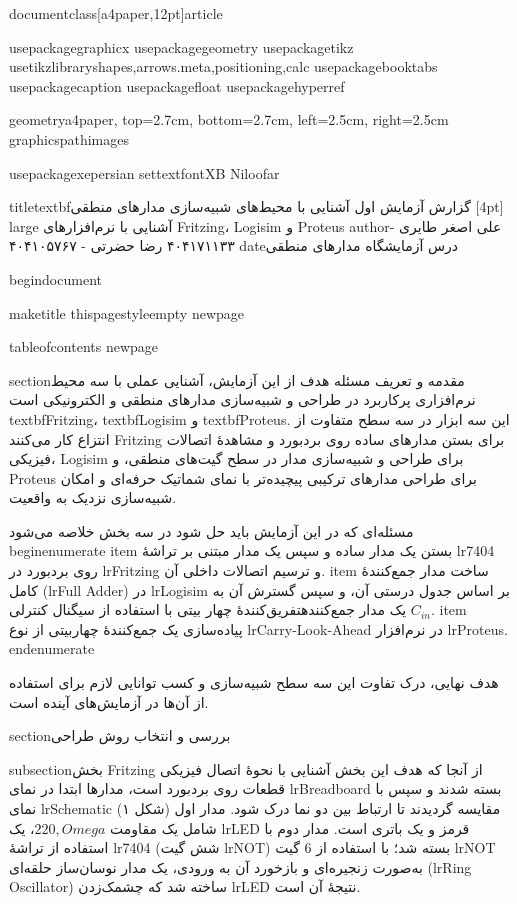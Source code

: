 documentclass[a4paper,12pt]{article}

usepackage{graphicx}
usepackage{geometry}
usepackage{tikz}
usetikzlibrary{shapes,arrows.meta,positioning,calc}
usepackage{booktabs}
usepackage{caption}
usepackage{float}
usepackage{hyperref}

geometry{a4paper, top=2.7cm, bottom=2.7cm, left=2.5cm, right=2.5cm}
graphicspath{{images}}

usepackage{xepersian}
settextfont{XB Niloofar}

title{textbf{گزارش آزمایش اول آشنایی با محیط‌های شبیه‌سازی مدارهای منطقی} [4pt]
large آشنایی با نرم‌افزارهای Fritzing، Logisim و Proteus}
author{علی اصغر طایری - ۴۰۴۱۷۱۱۳۳  رضا حضرتی - ۴۰۴۱۰۵۷۶۷}
date{درس آزمایشگاه مدارهای منطقی}

begin{document}

maketitle
thispagestyle{empty}
newpage

tableofcontents
newpage

section{مقدمه و تعریف مسئله}
هدف از این آزمایش، آشنایی عملی با سه محیط نرم‌افزاری پرکاربرد در طراحی و شبیه‌سازی مدارهای منطقی و الکترونیکی است textbf{Fritzing}، textbf{Logisim} و textbf{Proteus}. این سه ابزار در سه سطح متفاوت از انتزاع کار می‌کنند Fritzing برای بستن مدارهای ساده روی بردبورد و مشاهدهٔ اتصالات فیزیکی، Logisim برای طراحی و شبیه‌سازی مدار در سطح گیت‌های منطقی، و Proteus برای طراحی مدارهای ترکیبی پیچیده‌تر با نمای شماتیک حرفه‌ای و امکان شبیه‌سازی نزدیک به واقعیت.

مسئله‌ای که در این آزمایش باید حل شود در سه بخش خلاصه می‌شود
begin{enumerate}
item بستن یک مدار ساده و سپس یک مدار مبتنی بر تراشهٔ lr{7404} روی بردبورد در lr{Fritzing} و ترسیم اتصالات داخلی آن.
item ساخت مدار جمع‌کنندهٔ کامل (lr{Full Adder}) در lr{Logisim} بر اساس جدول درستی آن، و سپس گسترش آن به یک مدار جمع‌کنندهتفریق‌کنندهٔ چهار بیتی با استفاده از سیگنال کنترلی $C_{in}$.
item پیاده‌سازی یک جمع‌کنندهٔ چهاربیتی از نوع lr{Carry-Look-Ahead} در نرم‌افزار lr{Proteus}.
end{enumerate}

هدف نهایی، درک تفاوت این سه سطح شبیه‌سازی و کسب توانایی لازم برای استفاده از آن‌ها در آزمایش‌های آینده است.

section{بررسی و انتخاب روش طراحی}

subsection{بخش Fritzing}
از آنجا که هدف این بخش آشنایی با نحوهٔ اتصال فیزیکی قطعات روی بردبورد است، مدارها ابتدا در نمای lr{Breadboard} بسته شدند و سپس با نمای lr{Schematic} مقایسه گردیدند تا ارتباط بین دو نما درک شود. مدار اول (شکل ۱) شامل یک مقاومت $220,Omega$، یک lr{LED} قرمز و یک باتری است. مدار دوم با استفاده از تراشهٔ lr{7404} (شش گیت lr{NOT}) بسته شد؛ با استفاده از 6 گیت lr{NOT} به‌صورت زنجیره‌ای و بازخورد آن به ورودی، یک مدار نوسان‌ساز حلقه‌ای (lr{Ring Oscillator}) ساخته شد که چشمک‌زدن lr{LED} نتیجهٔ آن است.

